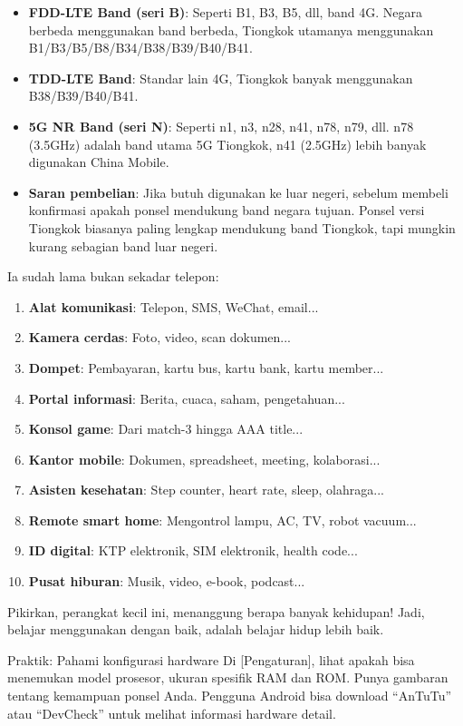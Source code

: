 \begin{itemize}
  \item \textbf{FDD-LTE Band (seri B)}: Seperti B1, B3, B5, dll, band 4G. Negara berbeda menggunakan band berbeda, Tiongkok utamanya menggunakan B1/B3/B5/B8/B34/B38/B39/B40/B41.
  \item \textbf{TDD-LTE Band}: Standar lain 4G, Tiongkok banyak menggunakan B38/B39/B40/B41.
  \item \textbf{5G NR Band (seri N)}: Seperti n1, n3, n28, n41, n78, n79, dll. n78 (3.5GHz) adalah band utama 5G Tiongkok, n41 (2.5GHz) lebih banyak digunakan China Mobile.
  \item \textbf{Saran pembelian}: Jika butuh digunakan ke luar negeri, sebelum membeli konfirmasi apakah ponsel mendukung band negara tujuan. Ponsel versi Tiongkok biasanya paling lengkap mendukung band Tiongkok, tapi mungkin kurang sebagian band luar negeri.
\end{itemize}


Ia sudah lama bukan sekadar telepon:

\begin{enumerate}
  \item \textbf{Alat komunikasi}: Telepon, SMS, WeChat, email...
  \item \textbf{Kamera cerdas}: Foto, video, scan dokumen...
  \item \textbf{Dompet}: Pembayaran, kartu bus, kartu bank, kartu member...
  \item \textbf{Portal informasi}: Berita, cuaca, saham, pengetahuan...
  \item \textbf{Konsol game}: Dari match-3 hingga AAA title...
  \item \textbf{Kantor mobile}: Dokumen, spreadsheet, meeting, kolaborasi...
  \item \textbf{Asisten kesehatan}: Step counter, heart rate, sleep, olahraga...
  \item \textbf{Remote smart home}: Mengontrol lampu, AC, TV, robot vacuum...
  \item \textbf{ID digital}: KTP elektronik, SIM elektronik, health code...
  \item \textbf{Pusat hiburan}: Musik, video, e-book, podcast...
\end{enumerate}

Pikirkan, perangkat kecil ini, menanggung berapa banyak kehidupan! Jadi, belajar menggunakan dengan baik, adalah belajar hidup lebih baik.

\begin{tcbpractice}{Praktik: Pahami konfigurasi hardware}
Di [Pengaturan], lihat apakah bisa menemukan model prosesor, ukuran spesifik RAM dan ROM. Punya gambaran tentang kemampuan ponsel Anda. Pengguna Android bisa download “AnTuTu” atau “DevCheck” untuk melihat informasi hardware detail.

\end{tcbpractice}
